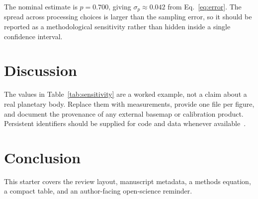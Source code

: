 \documentclass[review,article]{planetary}
\begin{document}
The nominal estimate is $p=0.700$, giving $\sigma_p\approx0.042$ from
Eq.~\eqref{eq:error}. The spread across processing choices is larger than the
sampling error, so it should be reported as a methodological sensitivity rather
than hidden inside a single confidence interval.

\section{Discussion}
The values in Table~\ref{tab:sensitivity} are a worked example, not a claim
about a real planetary body. Replace them with measurements, provide one file
per figure, and document the provenance of any external basemap or calibration
product. Persistent identifiers should be supplied for code and data whenever
available~\parencite{wilkinson2016}.

\section{Conclusion}
This starter covers the review layout, manuscript metadata, a methods equation,
a compact table, and an author-facing open-science reminder.

\printbibliography
\end{document}
